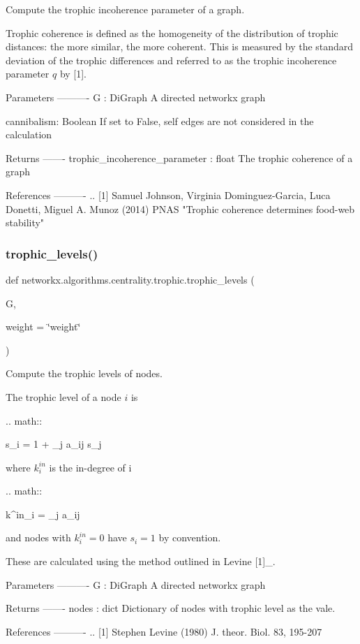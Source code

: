 \begin{DoxyVerb}Compute the trophic incoherence parameter of a graph.

Trophic coherence is defined as the homogeneity of the distribution of
trophic distances: the more similar, the more coherent. This is measured by
the standard deviation of the trophic differences and referred to as the
trophic incoherence parameter $q$ by [1].

Parameters
----------
G : DiGraph
    A directed networkx graph

cannibalism: Boolean
    If set to False, self edges are not considered in the calculation

Returns
-------
trophic_incoherence_parameter : float
    The trophic coherence of a graph

References
----------
.. [1] Samuel Johnson, Virginia Dominguez-Garcia, Luca Donetti, Miguel A.
    Munoz (2014) PNAS "Trophic coherence determines food-web stability"
\end{DoxyVerb}
 \mbox{\label{namespacenetworkx_1_1algorithms_1_1centrality_1_1trophic_a6eb640118d1d1bc94a2ae651a175ad4e}} 
\subsubsection{\texorpdfstring{trophic\+\_\+levels()}{trophic\_levels()}}
{\footnotesize\ttfamily def networkx.\+algorithms.\+centrality.\+trophic.\+trophic\+\_\+levels (\begin{DoxyParamCaption}\item[{}]{G,  }\item[{}]{weight = {\ttfamily \char`\"{}weight\char`\"{}} }\end{DoxyParamCaption})}

\begin{DoxyVerb}Compute the trophic levels of nodes.

The trophic level of a node $i$ is

.. math::

    s_i = 1 +  \sum_{j} a_{ij} s_j

where $k^{in}_i$ is the in-degree of i

.. math::

    k^{in}_i = \sum_{j} a_{ij}

and nodes with $k^{in}_i = 0$ have $s_i = 1$ by convention.

These are calculated using the method outlined in Levine [1]_.

Parameters
----------
G : DiGraph
    A directed networkx graph

Returns
-------
nodes : dict
    Dictionary of nodes with trophic level as the vale.

References
----------
.. [1] Stephen Levine (1980) J. theor. Biol. 83, 195-207
\end{DoxyVerb}
 